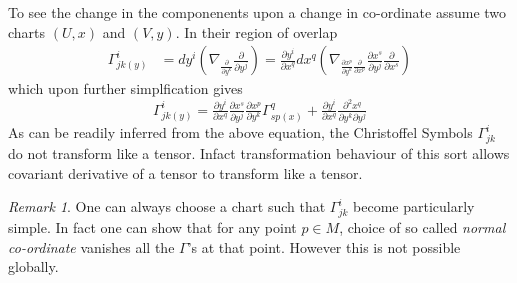 \documentclass[a4paper]{report}
\theoremstyle{definition}
\theoremstyle{remark}
\newtheorem*{remark}{Remark}
\begin{document}
		To see the change in the componenents upon a change in co-ordinate assume two charts $(U,x)$ and $(V,y)$. In their region of overlap
		\begin{equation*}
			\begin{split}
				\Gamma^{i}_{jk(y)} &= dy^i\left(\nabla_{\tfrac{\partial}{\partial y^k}}\tfrac{\partial}{\partial y^j}\right) = \tfrac{\partial y^i}{\partial x^q}dx^q\left(\nabla_{\tfrac{\partial x^p}{\partial y^k}\tfrac{\partial}{\partial x^p}}\tfrac{\partial x^s}{\partial y^j}\tfrac{\partial}{\partial x^s}\right) 
			\end{split}
		\end{equation*}
		which upon further simplfication gives
		\begin{equation}
			\Gamma_{jk(y)}^{i} = \tfrac{\partial y^i}{\partial x^q}\tfrac{\partial x^s}{\partial y^j}\tfrac{\partial x^p}{\partial y^k}\Gamma_{sp(x)}^{q} + \tfrac{\partial y^i}{\partial x^q}\tfrac{\partial^2 x^q}{\partial y^k\partial y^j}
		\end{equation}
		As can be readily inferred from the above equation, the Christoffel Symbols $\Gamma_{jk}^{i}$ do not transform like a tensor. Infact transformation behaviour of this sort allows covariant derivative of a tensor to transform like a tensor.
		\begin{remark}
			One can always choose a chart such that $\Gamma_{jk}^{i}$ become particularly simple. In fact one can show that for any point $p\in M$, choice of so called \emph{normal co-ordinate} vanishes all the $\Gamma$'s at that point. However this is not possible globally.
		\end{remark}
\end{document}
